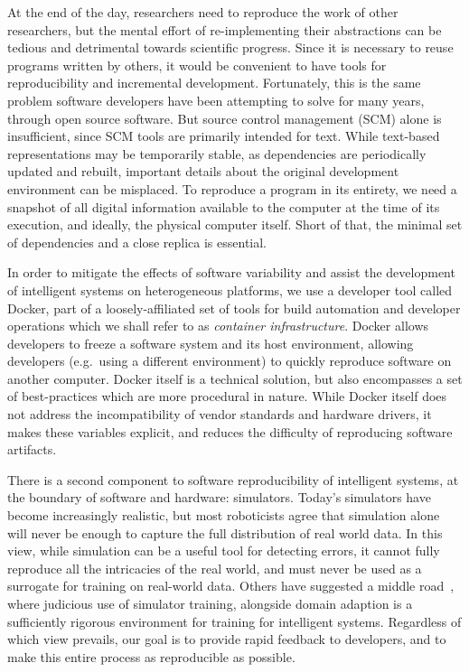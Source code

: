 \documentclass[12pt,initial,twoside,maitrise]{dms}
\numberwithin{equation}{section}
\numberwithin{table}{chapter}
\numberwithin{figure}{chapter}
\begin{document}
At the end of the day, researchers need to reproduce the work of other researchers, but the mental effort of re-implementing their abstractions can be tedious and detrimental towards scientific progress. Since it is necessary to reuse programs written by others, it would be convenient to have tools for reproducibility and incremental development. Fortunately, this is the same problem software developers have been attempting to solve for many years, through open source software. But source control management (SCM) alone is insufficient, since SCM tools are primarily intended for text. While text-based representations may be temporarily stable, as dependencies are periodically updated and rebuilt, important details about the original development environment can be misplaced. To reproduce a program in its entirety, we need a snapshot of all digital information available to the computer at the time of its execution, and ideally, the physical computer itself. Short of that, the minimal set of dependencies and a close replica is essential.

In order to mitigate the effects of software variability and assist the development of intelligent systems on heterogeneous platforms, we use a developer tool called Docker, part of a loosely-affiliated set of tools for build automation and developer operations which we shall refer to as \textit{container infrastructure}. Docker allows developers to freeze a software system and its host environment, allowing developers (e.g.~using a different environment) to quickly reproduce software on another computer. Docker itself is a technical solution, but also encompasses a set of best-practices which are more procedural in nature. While Docker itself does not address the incompatibility of vendor standards and hardware drivers, it makes these variables explicit, and reduces the difficulty of reproducing software artifacts.

There is a second component to software reproducibility of intelligent systems, at the boundary of software and hardware: simulators. Today's simulators have become increasingly realistic, but most roboticists agree that simulation alone will never be enough to capture the full distribution of real world data. In this view, while simulation can be a useful tool for detecting errors, it cannot fully reproduce all the intricacies of the real world, and must never be used as a surrogate for training on real-world data. Others have suggested a middle road~\cite{bousmalis2018using}, where judicious use of simulator training, alongside domain adaption is a sufficiently rigorous environment for training for intelligent systems. Regardless of which view prevails, our goal is to provide rapid feedback to developers, and to make this entire process as reproducible as possible.
\end{document}
